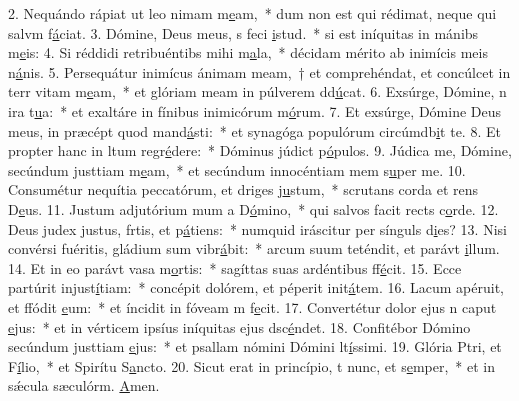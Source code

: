 2. Nequándo rápiat ut leo nimam m\uline{e}am,~* dum non est qui rédimat, neque qui salvm f\uline{á}ciat.
3. Dómine, Deus meus, s feci \uline{i}stud.~* si est iníquitas in mánibs m\uline{e}is:
4. Si réddidi retribuéntibs mihi m\uline{a}la,~* décidam mérito ab inimícis meis n\uline{á}nis.
5. Persequátur inimícus ánimam meam,~† et comprehéndat, et concúlcet in terr vitam m\uline{e}am,~* et glóriam meam in púlverem dd\uline{ú}cat.
6. Exsúrge, Dómine, n ira t\uline{u}a:~* et exaltáre in fínibus inimicórum m\uline{ó}rum.
7. Et exsúrge, Dómine Deus meus, in præcépt quod mand\uline{á}sti:~* et synagóga populórum circúmdb\uline{i}t te.
8. Et propter hanc in ltum regr\uline{é}dere:~* Dóminus júdict p\uline{ó}pulos.
9. Júdica me, Dómine, secúndum justtiam m\uline{e}am,~* et secúndum innocéntiam mem s\uline{u}per me.
10. Consumétur nequítia peccatórum, et driges j\uline{u}stum,~* scrutans corda et rens D\uline{e}us.
11. Justum adjutórium mum a D\uline{ó}mino,~* qui salvos facit rects c\uline{o}rde.
12. Deus judex justus, frtis, et p\uline{á}tiens:~* numquid iráscitur per sínguls d\uline{i}es?
13. Nisi convérsi fuéritis, gládium sum vibr\uline{á}bit:~* arcum suum teténdit, et parávt \uline{i}llum.
14. Et in eo parávt vasa m\uline{o}rtis:~* sagíttas suas ardéntibus ff\uline{é}cit.
15. Ecce partúrit injust\uline{í}tiam:~* concépit dolórem, et péperit init\uline{á}tem.
16. Lacum apéruit, et ffódit \uline{e}um:~* et íncidit in fóveam m f\uline{e}cit.
17. Convertétur dolor ejus n caput \uline{e}jus:~* et in vérticem ipsíus iníquitas ejus dsc\uline{é}ndet.
18. Confitébor Dómino secúndum justtiam \uline{e}jus:~* et psallam nómini Dómini lt\uline{í}ssimi.
19. Glória Ptri, et F\uline{í}lio,~* et Spirítu S\uline{a}ncto.
20. Sicut erat in princípio, t nunc, et s\uline{e}mper,~* et in sǽcula sæculórm. \uline{A}men.
